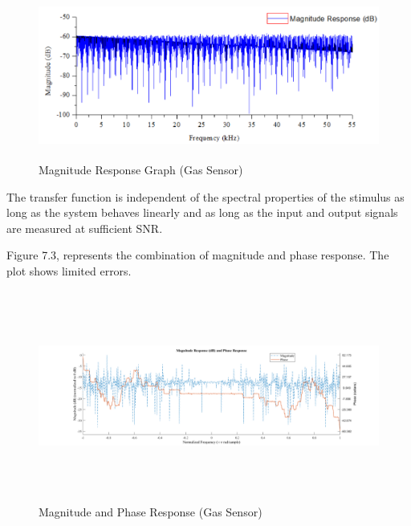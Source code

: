 \begin{enumerate}[label=\roman*]
\begin{figure}[H]
	\begin{Center}
		\includegraphics[width=5.91in,height=2.16in]{16}
		\caption{ Magnitude Response Graph (Gas Sensor)}
		\label{fig:_2_Magnitude_Response_Graph_Gas_Sensor}
	\end{Center}
\end{figure}
 The transfer function is independent of the spectral properties of the stimulus as long as the system behaves linearly and as long as the input and output signals are measured at sufficient SNR.


\par

\par

\begin{justify}
Figure 7.3, represents the combination of magnitude and phase response. The plot shows limited errors.
\end{justify}\par




\begin{figure}[H]
	\begin{Center}
		\includegraphics[width=5.52in,height=2.73in]{17}
		\caption{ Magnitude and Phase Response (Gas Sensor) }
		\label{fig:_3_Magnitude_and_Phase_Response_Gas_Sensor_}
	\end{Center}
\end{figure}



\end{enumerate}

